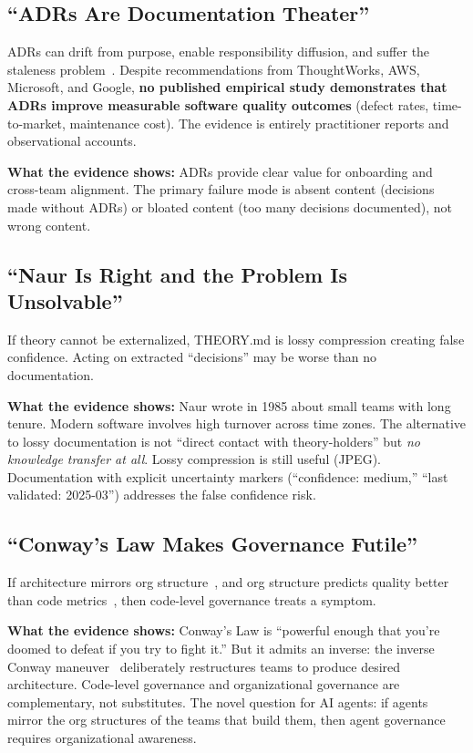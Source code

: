 \documentclass[11pt, a4paper, logo, copyright]{googledeepmind}
\begin{document}
\subsection{``ADRs Are Documentation Theater''}

ADRs can drift from purpose, enable responsibility diffusion, and suffer the staleness problem~\citep{spotify2020}. Despite recommendations from ThoughtWorks, AWS, Microsoft, and Google, \textbf{no published empirical study demonstrates that ADRs improve measurable software quality outcomes} (defect rates, time-to-market, maintenance cost). The evidence is entirely practitioner reports and observational accounts.

\textbf{What the evidence shows:} ADRs provide clear value for onboarding and cross-team alignment. The primary failure mode is absent content (decisions made without ADRs) or bloated content (too many decisions documented), not wrong content.

\subsection{``Naur Is Right and the Problem Is Unsolvable''}

If theory cannot be externalized, THEORY.md is lossy compression creating false confidence. Acting on extracted ``decisions'' may be worse than no documentation.

\textbf{What the evidence shows:} Naur wrote in 1985 about small teams with long tenure. Modern software involves high turnover across time zones. The alternative to lossy documentation is not ``direct contact with theory-holders'' but \emph{no knowledge transfer at all}. Lossy compression is still useful (JPEG). Documentation with explicit uncertainty markers (``confidence: medium,'' ``last validated: 2025-03'') addresses the false confidence risk.

\subsection{``Conway's Law Makes Governance Futile''}

If architecture mirrors org structure~\citep{conway1968}, and org structure predicts quality better than code metrics~\citep{nagappan2008}, then code-level governance treats a symptom.

\textbf{What the evidence shows:} Conway's Law is ``powerful enough that you're doomed to defeat if you try to fight it.'' But it admits an inverse: the inverse Conway maneuver~\citep{skelton2019} deliberately restructures teams to produce desired architecture. Code-level governance and organizational governance are complementary, not substitutes. The novel question for AI agents: if agents mirror the org structures of the teams that build them, then agent governance requires organizational awareness.
\end{document}
